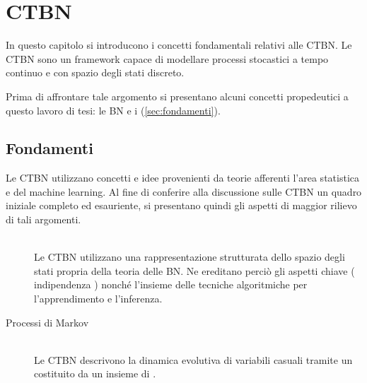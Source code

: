 
\chapter{\texorpdfstring{CTBN}{\ctbn{}}}
\label{cap:ctbn}
\acresetall
In questo capitolo si introducono i concetti fondamentali relativi alle \ac{CTBN}. Le \acs{CTBN} sono un framework capace di modellare processi stocastici a tempo continuo e con spazio degli stati discreto.

Prima di affrontare tale argomento si presentano alcuni concetti propedeutici a questo lavoro di tesi: le \ac{BN} e i \mprocess{} (\autoref{sec:fondamenti}).
\section{Fondamenti}
\label{sec:fondamenti}
Le \acl{CTBN} utilizzano concetti e idee provenienti da teorie afferenti l'area statistica e del machine learning. Al fine di conferire alla discussione sulle \acs{CTBN} un quadro iniziale completo ed esauriente, si presentano quindi gli aspetti di maggior rilievo di tali argomenti.
\begin{description}
\item[\bn{}] \hfill \\
Le \acl{CTBN} utilizzano una rappresentazione strutturata dello spazio degli stati propria della teoria delle \acl{BN}. Ne ereditano perciò gli aspetti chiave (\eg{} indipendenza \cond*{}) nonché l'insieme delle tecniche algoritmiche per l'apprendimento e l'inferenza.
\item[Processi di Markov]\label{sec:fondamenti-mp}\hfill \\
Le \acl{CTBN} descrivono la dinamica evolutiva di variabili casuali tramite un \mprocess*{} \omog*{} costituito da un insieme di \mprocess{} \cond{}.
\end{description} 

